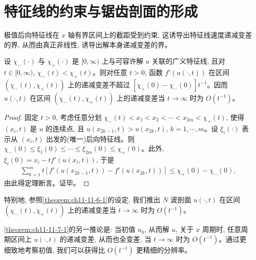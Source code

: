 \documentclass[../../main.tex]{subfiles}
\begin{document}
\section{特征线的约束与锯齿剖面的形成}\label{section:ch11-特征线约束与锯齿剖面}

极值后向特征线在 $x$ 轴有界区间上的截距受到约束, 这诱导出特征线速度递减变差的界, 从而由真正非线性, 诱导出解本身递减变差的界。

\begin{theorem}\label{theorem:ch11-11-7-1}
设 $\chi_-(\cdot)$ 与 $\chi_+(\cdot)$ 是 $[0,\infty)$ 上与可容许解 $u$ 关联的广义特征线, 且对 $t\in[0,\infty)$, $\chi_-(t)<\chi_+(t)$。则对任意 $t>0$, 函数 $f'(u(\cdot,t))$ 在区间 $(\chi_-(t),\chi_+(t))$ 上的递减变差不超过 $[\chi_+(0)-\chi_-(0)]t^{-1}$。因而 $u(\cdot,t)$ 在区间 $(\chi_-(t),\chi_+(t))$ 上的递减变差当 $t\to\infty$ 时为 $O(t^{-1})$。
\end{theorem}

\begin{proof}
固定 $t>0$, 考虑任意分划 $\chi_-(t)<x_1<x_2<\cdots<x_{2m}<\chi_+(t)$, 使得 $(x_i,t)$ 是 $u$ 的连续点, 且 $u(x_{2k-1},t)>u(x_{2k},t)$, $k=1,\cdots,m$。设 $\xi_i(\cdot)$ 表示从 $(x_i,t)$ 出发的(唯一)后向特征线。则 $\chi_-(0)\leqslant\xi_1(0)\leqslant\cdots\leqslant\xi_{2m}(0)\leqslant\chi_+(0)$。此外, $\xi_i(0)=x_i-tf'(u(x_i,t))$, 于是
\begin{align}
\sum_{k=1}^m t[f'(u(x_{2k-1},t))-f'(u(x_{2k},t))]\leqslant\chi_+(0)-\chi_-(0),\label{align:ch11-11-7-1}
\end{align}
由此得定理断言。证毕。
\end{proof}

特别地, 参照\cref{theorem:ch11-11-6-1}的设定, 我们推出 $N$ 波剖面 $u(\cdot,t)$ 在区间 $(\chi_-(t),\chi_+(t))$ 上的递减变差当 $t\to\infty$ 时为 $O(t^{-1})$。

\cref{theorem:ch11-11-7-1}的另一推论是: 当初值 $u_0$, 从而解 $u$, 关于 $x$ 周期时, 任意周期区间上 $u(\cdot,t)$ 的递减变差, 从而也全变差, 当 $t\to\infty$ 时为 $O(t^{-1})$。通过更细致地考察初值, 我们可以获得比 $O(t^{-1})$ 更精细的分辨率。
\end{document}
